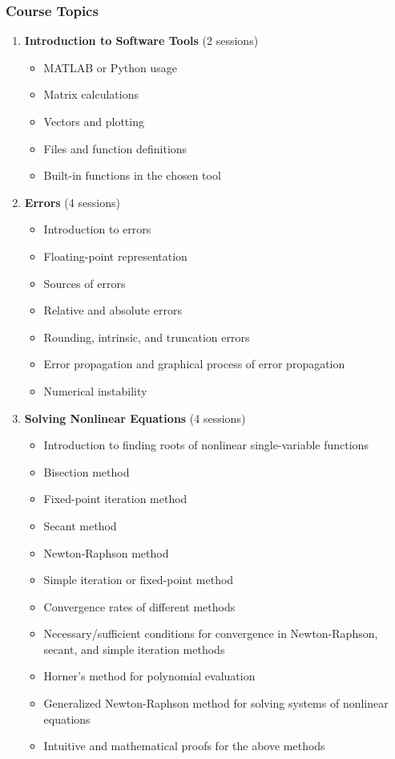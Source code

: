 \documentclass[12pt]{article}
\begin{document}
\subsubsection*{Course Topics}
\begin{enumerate}
    \item \textbf{Introduction to Software Tools} (2 sessions)
        \begin{itemize}
            \item MATLAB or Python usage
            \item Matrix calculations
            \item Vectors and plotting
            \item Files and function definitions
            \item Built-in functions in the chosen tool
        \end{itemize}
    
    \item \textbf{Errors} (4 sessions)
        \begin{itemize}
            \item Introduction to errors
            \item Floating-point representation
            \item Sources of errors
            \item Relative and absolute errors
            \item Rounding, intrinsic, and truncation errors
            \item Error propagation and graphical process of error propagation
            \item Numerical instability
        \end{itemize}

    \item \textbf{Solving Nonlinear Equations} (4 sessions)
        \begin{itemize}
            \item Introduction to finding roots of nonlinear single-variable functions
            \item Bisection method
            \item Fixed-point iteration method
            \item Secant method
            \item Newton-Raphson method
            \item Simple iteration or fixed-point method
            \item Convergence rates of different methods
            \item Necessary/sufficient conditions for convergence in Newton-Raphson, secant, and simple iteration methods
            \item Horner's method for polynomial evaluation
            \item Generalized Newton-Raphson method for solving systems of nonlinear equations
            \item Intuitive and mathematical proofs for the above methods
        \end{itemize}


\end{enumerate}
\end{document}
